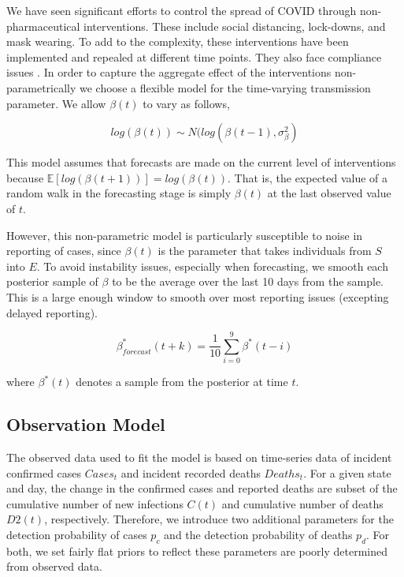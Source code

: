 \documentclass[11pt]{amsart}
\begin{document}
We have seen significant efforts to control the spread of COVID through non-pharmaceutical interventions. These include social distancing, lock-downs, and mask wearing. To add to the complexity, these interventions have been implemented and repealed at different time points. They also face compliance issues \cite{simonov2020persuasive}. In order to capture the aggregate effect of the interventions non-parametrically we choose a flexible model for the time-varying transmission parameter.
We allow $\beta(t)$ to vary as follows, 

\begin{equation}
log(\beta(t)) \sim N(log(\beta(t-1), \sigma_{\beta}^2)
\end{equation}

This model assumes that forecasts are made on the current level of interventions because $\mathbb{E}[log(\beta(t+1))] = log(\beta(t))$. That is, the expected value of a random walk in the forecasting stage is simply $\beta(t)$ at the last observed value of $t$. 

However, this non-parametric model is particularly susceptible to noise in reporting of cases, since $\beta(t)$ is the parameter that takes individuals from $S$ into $E$. To avoid instability issues, especially when forecasting, we smooth each posterior sample of $\beta$ to be the average over the last 10 days from the sample. This is a large enough window to smooth over most reporting issues (excepting delayed reporting). 

\begin{equation}
\beta^*_{forecast}(t+k) = \frac{1}{10}\sum_{i=0}^{9}\beta^*(t-i)
\end{equation}

where $\beta^*(t)$ denotes a sample from the posterior at time $t$.

% 
 \subsection{Observation Model}
 
 The observed data used to fit the model is based on time-series data of incident confirmed cases $Cases_{t}$ and incident recorded deaths $Deaths_{t}$. 
For a given state and day, the change in the  confirmed cases and reported deaths are subset of the cumulative number of new infections $C(t)$ and cumulative number of deaths $D2(t)$, respectively. Therefore, we introduce two additional parameters for the detection probability of cases $p_c$ and the detection probability of deaths $p_d$. For both, we set fairly flat priors to reflect these parameters are poorly determined from observed data.
\end{document}
